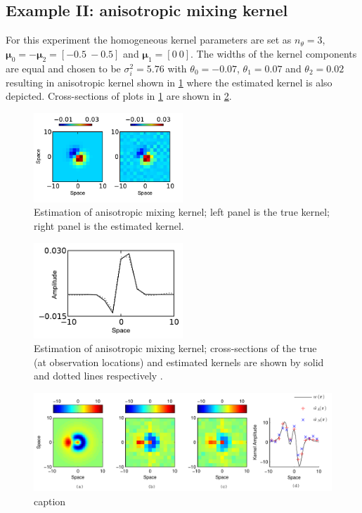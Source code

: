 \documentclass[10pt,twocolumn,twoside]{IEEEtran}
\begin{document}
\subsection{Example II: anisotropic mixing kernel}
For this experiment the homogeneous kernel parameters are set as $n_\theta=3$, $\boldsymbol\mu_0=-\boldsymbol\mu_2=[-0.5~-0.5]$ and $\boldsymbol\mu_1=[0~0]$. The widths  of the kernel components are equal and chosen to be $\sigma_i^2=5.76$ with $\theta_0=-0.07$, $\theta_1=0.07$ and $\theta_2=0.02$ resulting in anisotropic kernel shown in \figurename{\ref{fig:anisoKernel2d}} where the estimated kernel is also depicted. Cross-sections of plots in \figurename{\ref{fig:anisoKernel2d}} are shown in \figurename{\ref{fig:anisoKernel1d}}.
\begin{figure}[!h] 
 \centering
 \includegraphics[width=0.5\textwidth]{./Graph/anisoKernelEstimation2d.pdf}
 \caption{Estimation of anisotropic mixing kernel; left panel is the true kernel; right panel is the estimated kernel.}
 \label{fig:anisoKernel2d}
 \end{figure}
\begin{figure}[!h] 
 \centering
 \includegraphics[width=0.5\textwidth]{./Graph/anisoKernelSupportEstimation1d.pdf}
 \caption{Estimation of anisotropic mixing kernel;  cross-sections of the true (at observation locations) and estimated kernels are shown by solid and dotted lines respectively .}
 \label{fig:anisoKernel1d}    
 \end{figure}  

\begin{figure}[ht]
	\centering
		\includegraphics[scale=1]{./Graph/AnisoKernelIEEE.pdf}
	\caption{caption}
	\label{fig:label}
\end{figure}
\end{document}
